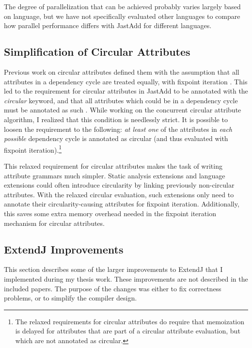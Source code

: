 \documentclass[10pt, twoside, openright]{book}
\begin{document}
The degree of parallelization that can be achieved probably varies largely based on language, but
we have not specifically evaluated other languages to compare how parallel performance differs
with JastAdd for different languages.


\subsection{Simplification of Circular Attributes}

Previous work on circular attributes defined them with the assumption that
all attributes in a dependency cycle are treated
equally, with fixpoint iteration \cite{DBLP:conf/sigplan/Farrow86,DBLP:journals/toplas/Jones90}.
This led to the requirement
for circular attributes in JastAdd to be annotated with the \emph{circular} keyword,
and that all attributes which could be in a dependency cycle must be annotated as such
\cite[p. 27]{DBLP:journals/scp/MagnussonH07}.
While working on the concurrent circular attribute algorithm, I realized that this condition
is needlessly strict. It is possible to loosen the requirement to the following: \emph{at
least one} of the attributes in \emph{each possible} dependency cycle is annotated as 
circular (and thus evaluated with fixpoint iteration).\footnote{The relaxed requirements
for circular attributes do require that memoization is delayed for attributes that are
part of a circular attribute evaluation, but which are not annotated as circular.}

This relaxed requirement for circular attributes makes the task of writing attribute
grammars much simpler.
Static analysis extensions and language extensions could often introduce circularity by
linking previously non-circular attributes. With the relaxed circular evaluation, such
extensions only need to annotate their circularity-causing attributes for fixpoint iteration.
Additionally, this saves some extra memory overhead needed in the fixpoint iteration mechanism
for circular attributes.


\subsection{ExtendJ Improvements}

This section describes some of the larger improvements to ExtendJ that I implemented
during my thesis work. These improvements are not described in the included papers.
The purpose of the changes was either to fix correctness problems, or to simplify
the compiler design.
\end{document}
